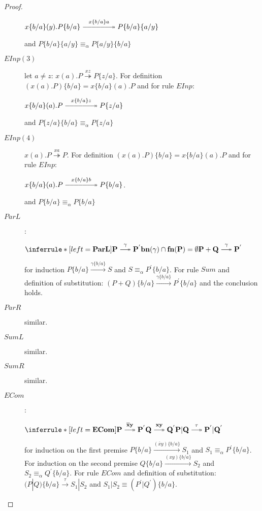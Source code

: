 \begin{lemma}
\begin{proof}
\begin{description}
\begin{center}
	  $x\{b/a\}(y).P\{b/a\}  \stackrel{x\{b/a\}a}{\HUGEtwoheadrightarrow} P\{b/a\} \{a/y\}$ 
	\end{center}
	and $P\{b/a\} \{a/y\} \equiv_{\alpha} P\{a/y\}\{b/a\}$
      \item[$EInp(3)$] let $a\neq z$:
	$x(a).P \stackrel{xz}{\twoheadrightarrow} P\{z/a\}$. For definition $(x(a).P)\{b/a\} =x\{b/a\}(a).P$ and for rule $EInp$: 
	\begin{center}
	  $x\{b/a\}(a).P \stackrel{x\{b/a\}z}{\HUGEtwoheadrightarrow} P\{z/a\}$
	\end{center}
	and $P\{z/a\}\{b/a\} \equiv_{\alpha} P\{z/a\}$
      \item[$EInp(4)$]
	$x(a).P \stackrel{xa}{\twoheadrightarrow} P$. For definition $(x(a).P)\{b/a\} =x\{b/a\}(a).P$ and for rule $EInp$:
	\begin{center}
	  $x\{b/a\}(a).P \stackrel{x\{b/a\}b}{\HUGEtwoheadrightarrow} P\{b/a\}$.
	\end{center}
	and $P\{b/a\} \equiv_{\alpha} P\{b/a\}$
      \item[$ParL$]:
	\begin{center}
	  $\inferrule* [left=\bf{ParL}]{
	      P \stackrel{\gamma}{\longtwoheadrightarrow} P^{'}
	    \\
	      bn(\gamma) \cap fn(P)=\emptyset
	  }{
	    P+Q \stackrel{\gamma}{\longtwoheadrightarrow} P^{'}
	  }$
	\end{center}
	for induction $P\{b/a\} \xrightarrow{\gamma\{b/a\}}S $ and $S \equiv_{\alpha} P^{'}\{b/a\}$. For rule $Sum$ and definition of substitution: $(P+Q)\{b/a\} \xrightarrow{\gamma\{b/a\}} P^{'}\{b/a\}$ and the conclusion holds.
      \item[$ParR$] similar.
      \item[$SumL$] similar.
      \item[$SumR$] similar.
      \item[$ECom$]:
	\begin{center}
	  $\inferrule* [left=\bf{ECom}]{
	      P \stackrel{\overline{x}y}{\longtwoheadrightarrow} P^{'}
	    \\
	      Q \stackrel{xy}{\longtwoheadrightarrow} Q^{'}
	  }{
	    P|Q \stackrel{\tau}{\longtwoheadrightarrow} P^{'}|Q^{'}
	  }$
	\end{center}
	for induction on the first premise $P\{b/a\} \xrightarrow{(\overline{x}y)\{b/a\}} S_{1}$ and $S_{1} \equiv_{\alpha} P^{'}\{b/a\}$. For induction on the second premise $Q\{b/a\} \xrightarrow{(xy)\{b/a\}} S_{2}$ and $S_{2} \equiv_{\alpha} Q^{'}\{b/a\}$. For rule $ECom$ and definition of substitution: $(P|Q)\{b/a\} \xrightarrow{\tau} S_{1}|S_{2}$ and $S_{1}|S_{2} \equiv (P^{'}|Q^{'})\{b/a\}$.

\end{description}
\end{proof}
\end{lemma}
